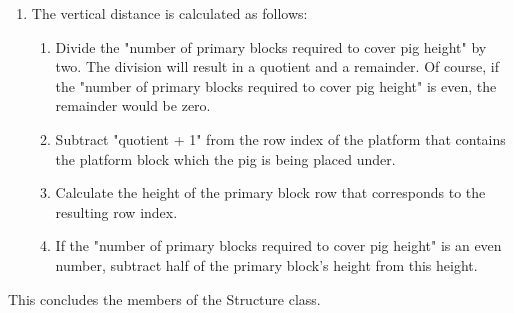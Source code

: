 \documentclass[12pt]{dalthesis}
\begin{document}
\begin{enumerate}
\begin{enumerate}
\begin{enumerate}
      \item The vertical distance is calculated as follows:

      \begin{enumerate}
        \item Divide the "number of primary blocks required to cover pig height" by two. The division will result in a quotient and a remainder. Of course, if the "number of primary blocks required to cover pig height" is even, the remainder would be zero.

        \item Subtract "quotient + 1" from the row index of the platform that contains the platform block which the pig is being placed under.

        \item Calculate the height of the primary block row that corresponds to the resulting row index.

        \item If the "number of primary blocks required to cover pig height" is an even number, subtract half of the primary block's height from this height.
      \end{enumerate}
    \end{enumerate}
  \end{enumerate}
\end{enumerate}

This concludes the members of the Structure class.
\end{document}

